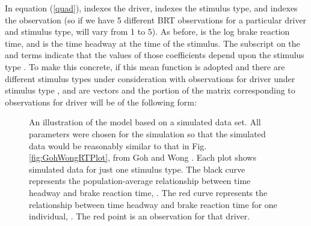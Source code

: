 \documentclass[conference]{IEEEtran}
\begin{document}
In equation (\ref{quad}),  indexes the driver,  indexes the stimulus type, and  indexes the observation (so if we have 5 different BRT observations for a particular driver and stimulus type,  will vary from 1 to 5).  As before,  is the log brake reaction time, and  is the time headway at the time of the stimulus.  The subscript  on the  and  terms indicate that the values of those coefficients depend upon the stimulus type .  To make this concrete, if this mean function is adopted and there are  different stimulus types under consideration with  observations for driver  under stimulus type ,  and  are  vectors and the portion of the  matrix corresponding to observations for driver  will be of the following form:

\begin{figure}[!t]
	\centering
{}
		\quad
{}
	\caption{An illustration of the model based on a simulated data set.  All parameters were chosen for the simulation so that the simulated data would be reasonably similar to that in Fig. \ref{fig:GohWongRTPlot}, from Goh and Wong \cite{GohWong:DriverPRTDuringSignalChange}.  Each plot shows simulated data for just one stimulus type.  The black curve represents the population-average relationship between time headway and brake reaction time, .  The red curve represents the relationship between time headway and brake reaction time for one individual, .  The red point is an observation for that driver.}
	\label{fig:ModelIllustrationSim}
\end{figure}
\end{document}
